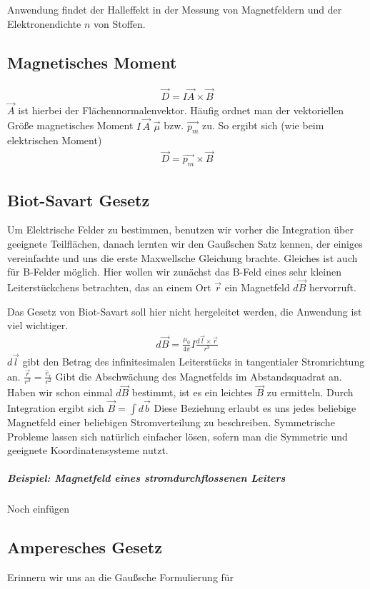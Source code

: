 Anwendung findet der Halleffekt in der Messung von Magnetfeldern und der Elektronendichte $n$ von Stoffen.

\subsection{Magnetisches Moment}
\begin{align} \label{eqn:Magnetisches Moment1}
\vec{D} = I \vec{A} \times \vec{B}
\end{align} $\vec{A}$ ist hierbei der Flächennormalenvektor. Häufig ordnet man der vektoriellen Größe magnetisches Moment $I \,\vec{A}$  $\vec{\mu}$ bzw. $\vec{p_m}$ zu. So ergibt sich (wie beim elektrischen Moment)
\begin{align} \label{eqn:Magnetisches Moment}
\boxed{\vec{D} = \vec{p_m} \times \vec{B}}
\end{align}

\subsection{Biot-Savart Gesetz}
Um Elektrische Felder zu bestimmen, benutzen wir vorher die Integration über geeignete Teilflächen, danach lernten wir den Gaußschen Satz kennen, der einiges vereinfachte und uns die erste Maxwellsche Gleichung brachte.
Gleiches ist auch für B-Felder möglich. Hier wollen wir zunächst das B-Feld eines sehr kleinen Leiterstückchens betrachten, das an einem Ort $\vec{r}$ ein Magnetfeld $d\vec{B}$ hervorruft. 

Das Gesetz von Biot-Savart soll hier nicht hergeleitet werden, die Anwendung ist viel wichtiger.
\begin{align} \label{eqn:Biot-Savart}
\boxed{d\vec{B} = \frac{\mu_0}{4\pi} I \frac{d\vec{l} \times \vec{r}}{r^3}}
\end{align}$d\vec{l}$ gibt den Betrag des infinitesimalen Leiterstücks in tangentialer Stromrichtung an. $\frac{\vec{r}}{r^3} = \frac{\hat{e}_r}{r^2}$ Gibt die Abschwächung des Magnetfelds im Abstandsquadrat an.   Haben wir schon einmal $d\vec{B}$ bestimmt, ist es ein leichtes $\vec{B}$ zu 
ermitteln.
Durch Integration ergibt sich $\vec{B} = \int d\vec{b}$ 
Diese Beziehung erlaubt es uns jedes beliebige Magnetfeld einer beliebigen Stromverteilung zu beschreiben. Symmetrische Probleme lassen sich natürlich einfacher lösen, sofern man die Symmetrie und geeignete Koordinatensysteme nutzt.
\subparagraph{Beispiel: Magnetfeld eines stromdurchflossenen Leiters}
Noch einfügen

\subsection{Amperesches Gesetz}
Erinnern wir uns an die Gaußsche Formulierung für 
